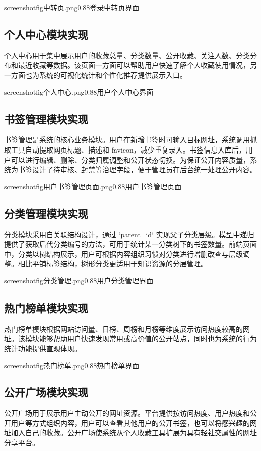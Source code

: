\documentclass[12pt,a4paper]{ctexart}
\begin{document}
screenshotfig{中转页.png}{0.88}{登录中转页界面}

\subsection{个人中心模块实现}
个人中心用于集中展示用户的收藏总量、分类数量、公开收藏、关注人数、分类分布和最近收藏等数据。该页面一方面可以帮助用户快速了解个人收藏使用情况，另一方面也为系统的可视化统计和个性化推荐提供展示入口。

screenshotfig{个人中心.png}{0.88}{用户个人中心界面}

\subsection{书签管理模块实现}
书签管理是系统的核心业务模块。用户在新增书签时可输入目标网址，系统调用抓取工具自动提取网页标题、描述和 favicon，减少重复录入。书签信息入库后，用户可以进行编辑、删除、分类归属调整和公开状态切换。为保证公开内容质量，系统为书签设计了待审核、封禁等治理字段，便于管理员在后台统一处理公开内容。

screenshotfig{用户书签管理页面.png}{0.88}{用户书签管理页面}

\subsection{分类管理模块实现}
分类模块采用自关联结构设计，通过 `parent_id` 实现父子分类层级。模型中递归提供了获取后代分类编号的方法，可用于统计某一分类树下的书签数量。前端页面中，分类以树结构展示，用户可根据内容组织习惯对分类进行增删改查与层级调整。相比平铺标签结构，树形分类更适用于知识资源的分层管理。

screenshotfig{分类管理.png}{0.88}{用户分类管理界面}

\subsection{热门榜单模块实现}
热门榜单模块根据网站访问量、日榜、周榜和月榜等维度展示访问热度较高的网址。该模块能够帮助用户快速发现常用或高价值的公开站点，同时也为系统的行为统计功能提供直观体现。

screenshotfig{热门榜单.png}{0.88}{热门榜单界面}

\subsection{公开广场模块实现}
公开广场用于展示用户主动公开的网址资源。平台提供按访问热度、用户热度和公开用户等方式组织内容，用户可以查看其他用户的公开书签，也可以将感兴趣的网址加入自己的收藏。公开广场使系统从个人收藏工具扩展为具有轻社交属性的网址分享平台。
\end{document}
